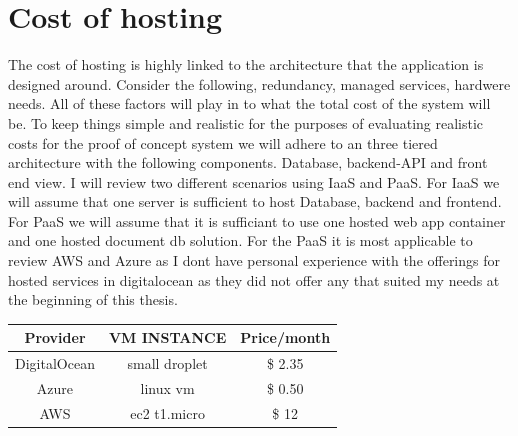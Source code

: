 \documentclass[]{uiophd}
\begin{document}
\section{Cost of hosting}
The cost of hosting is highly linked to the architecture that the application is designed around. Consider the following, redundancy, managed services, hardwere needs. All of these factors will play in to what the total cost of the system will be. To keep things simple and realistic for the purposes of evaluating realistic costs for the proof of concept system we will adhere to an three tiered architecture with the following components. Database, backend-API and front end view. I will review two different scenarios using IaaS and PaaS. For IaaS we will assume that one server is sufficient to host Database, backend and frontend. For PaaS we will assume that it is sufficiant to use one hosted web app container and one hosted document db solution. For the PaaS it is most applicable to review AWS and Azure as I dont have personal experience with the offerings for hosted services in digitalocean as they did not offer any that suited my needs at the beginning of this thesis.

\begin{center}
 \begin{tabular}{||c | c | c ||} 
 \hline
 Provider & VM INSTANCE & Price/month \\ [0.5ex] 
 \hline\hline
 DigitalOcean & small droplet & \$ 2.35 \\ 
 \hline
 Azure & linux vm &\$ 0.50 \\
 \hline
 AWS & ec2 t1.micro &\$ 12 \\
 \hline
\end{tabular}
\end{center}
\end{document}
